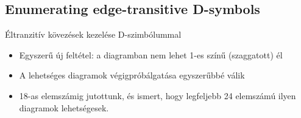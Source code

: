 \subsection{Enumerating edge-transitive D-symbols}
\begin{frame}
  Éltranzitív kövezések kezelése D-szimbólummal
  \begin{itemize}
    \item Egyszerű új feltétel: a diagramban nem lehet 1-es színű (szaggatott)
      él
    \item A lehetséges diagramok végigpróbálgatása egyszerűbbé válik
    \item 18-as elemszámig jutottunk, és ismert, hogy legfeljebb 24 elemszámú
      ilyen diagramok lehetségesek.
  \end{itemize}
\end{frame}


